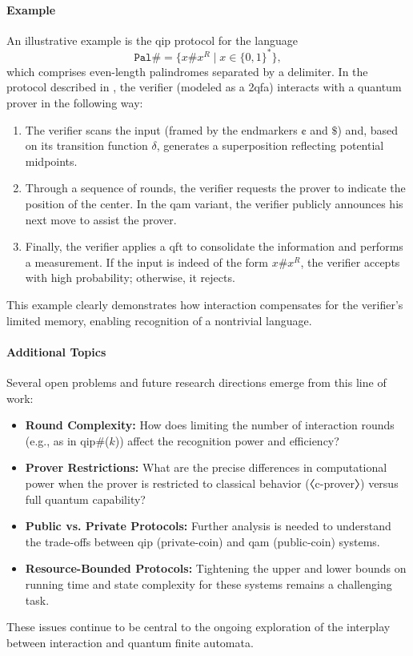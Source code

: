 \paragraph{Example}
An illustrative example is the \gls{qip} protocol for the language
\[
\mathtt{Pal\#} = \{x\#x^R \mid x\in\{0,1\}^*\},
\]
which comprises even-length palindromes separated by a delimiter. In the protocol described in \cite{nishimura2015interactive}, the verifier (modeled as a 2qfa) interacts with a quantum prover in the following way:
\begin{enumerate}
  \item The verifier scans the input (framed by the endmarkers $\cent$ and $\$$) and, based on its transition function $\delta$, generates a superposition reflecting potential midpoints.
  \item Through a sequence of rounds, the verifier requests the prover to indicate the position of the center. In the \gls{qam} variant, the verifier publicly announces his next move to assist the prover.
  \item Finally, the verifier applies a \gls{qft} to consolidate the information and performs a measurement. If the input is indeed of the form $x\#x^R$, the verifier accepts with high probability; otherwise, it rejects.
\end{enumerate}
This example clearly demonstrates how interaction compensates for the verifier's limited memory, enabling recognition of a nontrivial language.

\paragraph{Additional Topics}
Several open problems and future research directions emerge from this line of work:
\begin{itemize}
  \item \textbf{Round Complexity:} How does limiting the number of interaction rounds (e.g., as in \gls{qip}\#($k$)) affect the recognition power and efficiency?
  \item \textbf{Prover Restrictions:} What are the precise differences in computational power when the prover is restricted to classical behavior (〈c-prover〉) versus full quantum capability?
  \item \textbf{Public vs. Private Protocols:} Further analysis is needed to understand the trade-offs between \gls{qip} (private-coin) and \gls{qam} (public-coin) systems.
  \item \textbf{Resource-Bounded Protocols:} Tightening the upper and lower bounds on running time and state complexity for these systems remains a challenging task.
\end{itemize}
These issues continue to be central to the ongoing exploration of the interplay between interaction and quantum finite automata.

